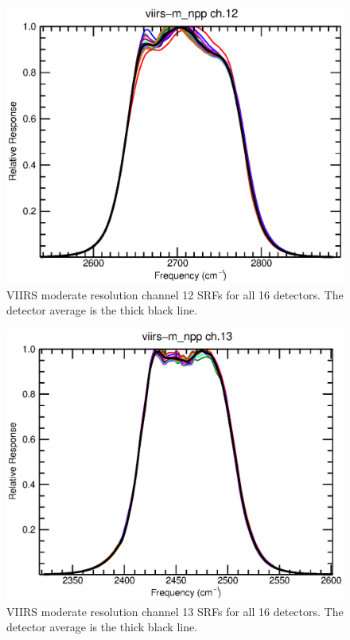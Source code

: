 \begin{figure}[H]
  \centering
  \includegraphics[bb= 0 15 400 330,clip,scale=0.8]{graphics/srfs/viirs-m_npp-12.eps}
  \caption{VIIRS moderate resolution channel 12 SRFs for all 16 detectors. The detector average is the thick black line.}
  \label{fig:viirs-m_npp-12}
\end{figure}
\begin{figure}[H]
  \centering
  \includegraphics[bb= 0 15 400 330,clip,scale=0.8]{graphics/srfs/viirs-m_npp-13.eps}
  \caption{VIIRS moderate resolution channel 13 SRFs for all 16 detectors. The detector average is the thick black line.}
  \label{fig:viirs-m_npp-13}
\end{figure}
